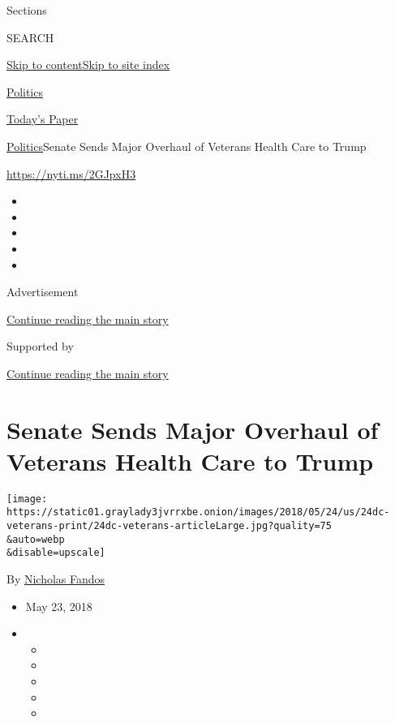 Sections

SEARCH

\protect\hyperlink{site-content}{Skip to
content}\protect\hyperlink{site-index}{Skip to site index}

\href{https://www.nytimes3xbfgragh.onion/section/politics}{Politics}

\href{https://myaccount.nytimes3xbfgragh.onion/auth/login?response_type=cookie\&client_id=vi}{}

\href{https://www.nytimes3xbfgragh.onion/section/todayspaper}{Today's
Paper}

\href{/section/politics}{Politics}\textbar{}Senate Sends Major Overhaul
of Veterans Health Care to Trump

\url{https://nyti.ms/2GJpxH3}

\begin{itemize}
\item
\item
\item
\item
\item
\end{itemize}

Advertisement

\protect\hyperlink{after-top}{Continue reading the main story}

Supported by

\protect\hyperlink{after-sponsor}{Continue reading the main story}

\hypertarget{senate-sends-major-overhaul-of-veterans-health-care-to-trump}{%
\section{Senate Sends Major Overhaul of Veterans Health Care to
Trump}\label{senate-sends-major-overhaul-of-veterans-health-care-to-trump}}

\texttt{[image: https://static01.graylady3jvrrxbe.onion/images/2018/05/24/us/24dc-veterans-print/24dc-veterans-articleLarge.jpg?quality=75\\\&auto=webp\\\&disable=upscale]}

By \href{https://www.nytimes3xbfgragh.onion/by/nicholas-fandos}{Nicholas
Fandos}

\begin{itemize}
\item
  May 23, 2018
\item
  \begin{itemize}
  \item
  \item
  \item
  \item
  \item
  \end{itemize}
\end{itemize}

